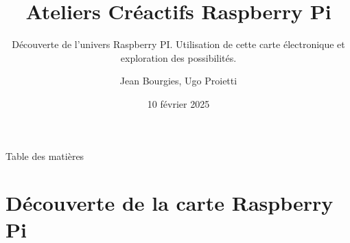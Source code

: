 \documentclass[aspectratio=169,xcolor=dvipsnames]{beamer}
\title{Ateliers Créactifs Raspberry Pi}
\subtitle{Découverte de l'univers Raspberry PI. Utilisation de cette carte électronique et exploration des possibilités.}
\author{Jean Bourgies, Ugo Proietti}
\date{10 février 2025}
\begin{document}
\begin{frame}
    \titlepage
\end{frame}

\begin{frame}{Table des matières}
    \tableofcontents
\end{frame}

\section{Découverte de la carte Raspberry Pi}
\end{document}
